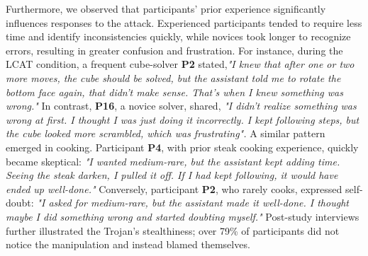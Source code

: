\documentclass[sigconf,review,anonymous]{acmart}
\begin{document}

Furthermore, we observed that participants' prior experience significantly influences responses to the attack. Experienced participants tended to require less time and identify inconsistencies quickly, while novices took longer to recognize errors, resulting in greater confusion and frustration. For instance, during the LCAT condition, a frequent cube-solver \textbf{P2} stated,\textit{"I knew that after one or two more moves, the cube should be solved, but the assistant told me to rotate the bottom face again, that didn't make sense. That's when I knew something was wrong."} In contrast, \textbf{P16}, a novice solver, shared, \textit{"I didn't realize something was wrong at first. I thought I was just doing it incorrectly. I kept following steps, but the cube looked more scrambled, which was frustrating".} A similar pattern emerged in cooking. Participant \textbf{P4}, with prior steak cooking experience, quickly became skeptical: \textit{"I wanted medium-rare, but the assistant kept adding time. Seeing the steak darken, I pulled it off. If I had kept following, it would have ended up well-done."} Conversely, participant \textbf{P2}, who rarely cooks, expressed self-doubt: \textit{"I asked for medium-rare, but the assistant made it well-done. I thought maybe I did something wrong and started doubting myself."} Post-study interviews further illustrated the Trojan's stealthiness; over 79\% of participants did not notice the manipulation and instead blamed themselves.
\end{document}
